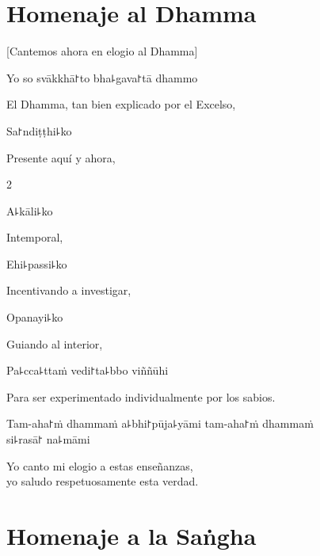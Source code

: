 \chapter{Homenaje al Dhamma}

\begin{leader}
\end{leader}

\begin{english}
  [Cantemos ahora en elogio al Dhamma]
\end{english}

Yo so svākkhā꜓to bha꜕gava꜓tā dhammo

\begin{english}
  El Dhamma, tan bien explicado por el Excelso,
\end{english}

Sa꜓ndiṭṭhi꜕ko

\begin{english}
  Presente aquí y ahora,
\end{english}2

A꜕kāli꜕ko

\begin{english}
  Intemporal,
\end{english}

Ehi꜕passi꜕ko

\begin{english}
  Incentivando a investigar,
\end{english}

Opanayi꜕ko

\begin{english}
  Guiando al interior,
\end{english}

Pa꜕cca꜕ttaṁ vedi꜓ta꜕bbo viññūhi

\begin{english}
  Para ser experimentado individualmente por los sabios.
\end{english}

Tam-aha꜓ṁ dhammaṁ a꜕bhi꜓pūja꜕yāmi tam-aha꜓ṁ dhammaṁ \\si꜕rasā꜓ na꜕māmi

\begin{english}
  Yo canto mi elogio a estas enseñanzas,\\
  yo saludo respetuosamente esta verdad.
\end{english}

\clearpage

\chapter{Homenaje a la Saṅgha}

